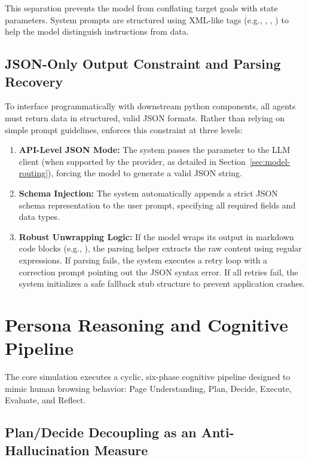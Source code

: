 This separation prevents the model from conflating target goals with state parameters. System prompts are structured using XML-like tags (e.g., , , ) to help the model distinguish instructions from data.

\subsection{JSON-Only Output Constraint and Parsing Recovery}
\label{sec:json-constraints}

To interface programmatically with downstream python components, all agents must return data in structured, valid JSON formats. Rather than relying on simple prompt guidelines, \versimux{} enforces this constraint at three levels:
\begin{enumerate}
    \item \textbf{API-Level JSON Mode:} The system passes the  parameter to the LLM client (when supported by the provider, as detailed in Section~\ref{sec:model-routing}), forcing the model to generate a valid JSON string.
    \item \textbf{Schema Injection:} The system automatically appends a strict JSON schema representation to the user prompt, specifying all required fields and data types.
    \item \textbf{Robust Unwrapping Logic:} If the model wraps its output in markdown code blocks (e.g., ), the parsing helper extracts the raw content using regular expressions. If parsing fails, the system executes a retry loop with a correction prompt pointing out the JSON syntax error. If all retries fail, the system initializes a safe fallback stub structure to prevent application crashes.
\end{enumerate}


\section{Persona Reasoning and Cognitive Pipeline}
\label{sec:cognitive-reasoning}

The core simulation executes a cyclic, six-phase cognitive pipeline designed to mimic human browsing behavior: Page Understanding, Plan, Decide, Execute, Evaluate, and Reflect.

\subsection{Plan/Decide Decoupling as an Anti-Hallucination Measure}
\label{sec:plan-decide-decoupling}

